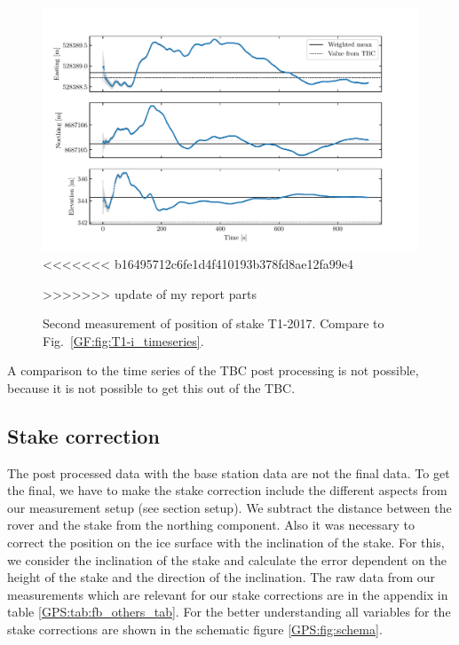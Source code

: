 \begin{figure}[H]
    \centering
    \includegraphics[width=\textwidth]{./figs/timeseries/46250723_corr-T1-ii-2017_Timeseries-east-north-elev.pdf}
<<<<<<< b16495712c6fe1d4f410193b378fd8ae12fa99e4
    \caption{Second measurement of position of stake T1-2017. Compare to Fig.~\ref{GF:fig:T1-i_timeseries}.}
    \label{GPS:fig:T1-ii_timeseries}
>>>>>>> update of my report parts
\end{figure}

A comparison to the time series of the TBC post processing is not possible, because it is not possible to get this out of the TBC.


\subsection{Stake correction}
The post processed data with the base station data are not the final data. 
To get the final, we have to make the stake correction include the different aspects from our measurement setup (see section setup).
We subtract the distance between the rover and the stake from the northing component.
Also it was necessary to correct the position on the ice surface with the inclination of the stake. 
For this, we consider the inclination of the stake and calculate the error dependent on the height of the stake and the direction of the inclination.
The raw data from our measurements which are relevant for our stake corrections are in the appendix in table \ref{GPS:tab:fb_others_tab}.
For the better understanding all variables for the stake corrections are shown in the schematic figure \ref{GPS:fig:schema}.
\medskip

